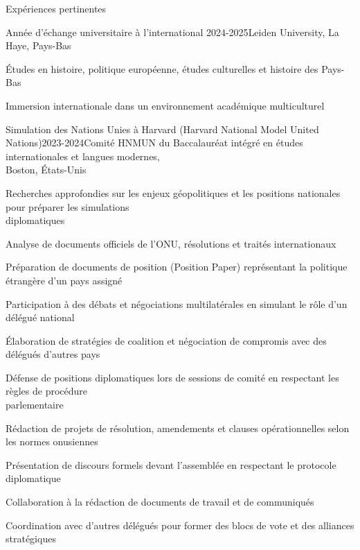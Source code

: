 \documentclass{resume} %
\begin{document}

\begin{rSection}{Expériences pertinentes}

\begin{rSubsection}{Année d'échange universitaire à l'international} {2024-2025}{Leiden University, La Haye, Pays-Bas}{}
\item Études en histoire, politique européenne, études culturelles et histoire des Pays-Bas
\item Immersion internationale dans un environnement académique multiculturel
\end{rSubsection}  


\begin{rSubsection}{Simulation des Nations Unies à Harvard (Harvard National Model United \\Nations)}{2023-2024}{Comité HNMUN du Baccalauréat intégré en études internationales et langues modernes, \\Boston, États-Unis}{} 
\item Recherches approfondies sur les enjeux géopolitiques et les positions nationales pour préparer les simulations \\diplomatiques
\item Analyse de documents officiels de l'ONU, résolutions et traités internationaux
\item Préparation de documents de position (Position Paper) représentant la politique étrangère d'un pays assigné  
\item Participation à des débats et négociations multilatérales en simulant le rôle d'un délégué national
\item Élaboration de stratégies de coalition et négociation de compromis avec des délégués d'autres pays
\item Défense de positions diplomatiques lors de sessions de comité en respectant les règles de procédure \\parlementaire
\item Rédaction de projets de résolution, amendements et clauses opérationnelles selon les normes onusiennes
\item Présentation de discours formels devant l'assemblée en respectant le protocole diplomatique
\item Collaboration à la rédaction de documents de travail et de communiqués
\item Coordination avec d'autres délégués pour former des blocs de vote et des alliances stratégiques


\end{rSubsection}
\end{rSection}
\end{document}
